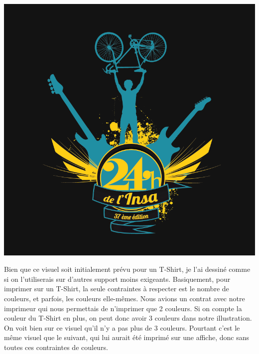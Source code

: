             \begin{center}
                \includegraphics[width=\textwidth]{img/logo-TShirt-bichro.png}
            \end{center}
                Bien que ce visuel soit initialement prévu pour un T-Shirt, je l'ai dessiné comme si on l'utiliserais sur d'autres support moins exigeants.
                Basiquement, pour imprimer sur un T-Shirt, la seule contraintes à respecter est le nombre de couleurs, et parfois, les couleurs elle-mêmes.
                Nous avions un contrat avec notre imprimeur qui nous permettais de n'imprimer que 2 couleurs.
                Si on compte la couleur du T-Shirt en plus, on peut donc avoir 3 couleurs dans notre illustration.
                On voit bien sur ce visuel qu'il n'y a pas plus de 3 couleurs.
                Pourtant c'est le même visuel que le suivant, qui lui aurait été imprimé sur une affiche, donc sans toutes ces contraintes de couleurs.
                
